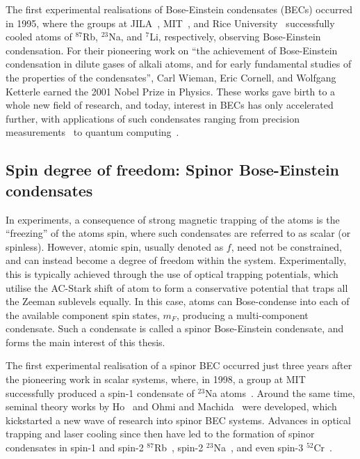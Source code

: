 The first experimental realisations of Bose-Einstein condensates (BECs) occurred
in 1995, where the groups at JILA~\cite{Anderson1995}, MIT~\cite{Davis1995}, and
Rice University~\cite{Bradley1995} successfully cooled atoms of \(^{87}\)Rb,
\(^{23}\)Na, and \(^{7}\)Li, respectively, observing Bose-Einstein condensation.
For their pioneering work on ``the achievement of Bose-Einstein condensation in
dilute gases of alkali atoms, and for early fundamental studies of the
properties of the condensates'', Carl Wieman, Eric Cornell, and Wolfgang
Ketterle earned the 2001 Nobel Prize in Physics.
These works gave birth to a whole new field of research, and today, interest in
BECs has only accelerated further, with applications of such condensates ranging
from precision measurements~\cite{Obrecht2007} to quantum
computing~\cite{Byrnes2012}.

\subsection{Spin degree of freedom: Spinor Bose-Einstein condensates}
In experiments, a consequence of strong magnetic trapping of the atoms is the
``freezing'' of the atoms spin, where such condensates are referred to as
scalar (or spinless).
However, atomic spin, usually denoted as \(f\), need not be constrained, and
can instead become a degree of freedom within the system.
Experimentally, this is typically achieved through the use of optical trapping
potentials, which utilise the AC-Stark shift of atom to form a conservative
potential that traps all the Zeeman sublevels equally.
In this case, atoms can Bose-condense into each of the available component spin
states, \(m_F\), producing a multi-component condensate.
Such a condensate is called a spinor Bose-Einstein condensate, and forms the
main interest of this thesis.

The first experimental realisation of a spinor BEC occurred just three years
after the pioneering work in scalar systems, where, in 1998, a group at MIT
successfully produced a spin-1 condensate of \({^{23}}\)Na
atoms~\cite{Stamper-Kurn1998}.
Around the same time, seminal theory works by Ho~\cite{Ho1998} and Ohmi and
Machida~\cite{Ohmi1998} were developed, which kickstarted a new wave of research
into spinor BEC systems.
Advances in optical trapping and laser cooling since then have led to the
formation of spinor condensates in spin-1 and spin-2
\(^{87}\)Rb~\cite{Barrett2001, Schmaljohann2004},
spin-2 \(^{23}\)Na~\cite{Gorlitz2003}, and
even spin-3 \(^{52}\)Cr~\cite{Beaufils2008}.


